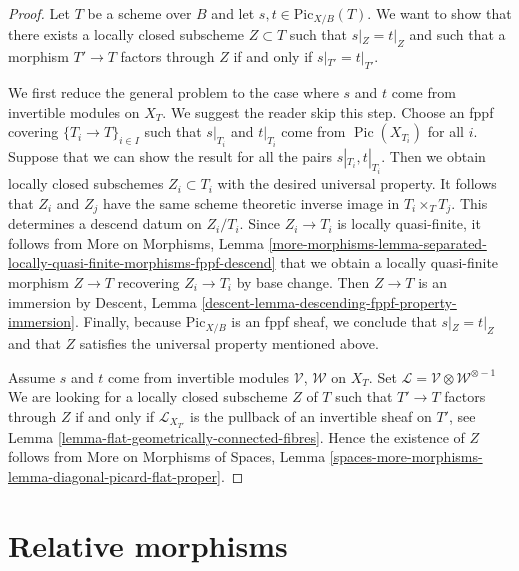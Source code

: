 \documentclass{stacks-project}
\theoremstyle{plain}
\theoremstyle{definition}
\theoremstyle{remark}
\numberwithin{equation}{subsection}
\def\Pic{\mathop{\mathrm{Pic}}\nolimits}
\def\Picardfunctor{\mathrm{Pic}}
\begin{document}
\begin{proof}
Let $T$ be a scheme over $B$ and let $s, t \in \Picardfunctor_{X/B}(T)$.
We want to show that there exists a locally closed subscheme $Z \subset T$
such that $s|_Z = t|_Z$ and such that a morphism $T' \to T$ factors
through $Z$ if and only if $s|_{T'} = t|_{T'}$.

\medskip\noindent
We first reduce the general problem to the case where $s$ and $t$ come
from invertible modules on $X_T$. We suggest the reader skip this step.
Choose an fppf covering $\{T_i \to T\}_{i \in I}$ such that
$s|_{T_i}$ and $t|_{T_i}$ come from $\Pic(X_{T_i})$ for all $i$.
Suppose that we can show the result for all the pairs
$s|_{T_i}, t|_{T_i}$. Then we obtain locally closed subschemes
$Z_i \subset T_i$ with the desired universal property.
It follows that $Z_i$ and $Z_j$ have the same scheme theoretic
inverse image in $T_i \times_T T_j$.
This determines a descend datum on $Z_i/T_i$.
Since $Z_i \to T_i$ is locally quasi-finite, it follows from
More on Morphisms, Lemma
\ref{more-morphisms-lemma-separated-locally-quasi-finite-morphisms-fppf-descend}
that we obtain a locally quasi-finite morphism $Z \to T$
recovering $Z_i \to T_i$ by base change. Then $Z \to T$ is an immersion
by Descent, Lemma \ref{descent-lemma-descending-fppf-property-immersion}.
Finally, because $\Picardfunctor_{X/B}$ is an fppf sheaf, we conclude
that $s|_Z = t|_Z$ and that $Z$ satisfies the universal property
mentioned above.

\medskip\noindent
Assume $s$ and $t$ come from invertible modules $\mathcal{V}$, $\mathcal{W}$
on $X_T$.
Set $\mathcal{L} = \mathcal{V} \otimes \mathcal{W}^{\otimes -1}$
We are looking for a locally closed subscheme $Z$ of $T$
such that $T' \to T$ factors through $Z$ if and only if $\mathcal{L}_{X_{T'}}$
is the pullback of an invertible sheaf on $T'$, see
Lemma \ref{lemma-flat-geometrically-connected-fibres}.
Hence the existence of $Z$ follows from
More on Morphisms of Spaces, Lemma
\ref{spaces-more-morphisms-lemma-diagonal-picard-flat-proper}.
\end{proof}











\section{Relative morphisms}
\label{section-relative-morphisms}
\end{document}
